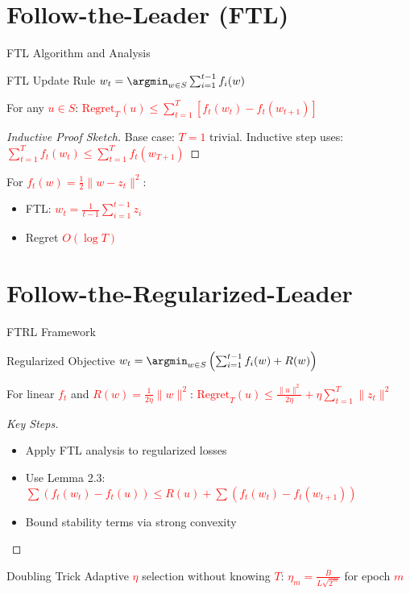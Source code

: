 \documentclass{beamer}
\newcommand{\mathred}[1]{\textcolor{red}{$#1$}} %
\begin{document}
\section{Follow-the-Leader (FTL)}
\begin{frame}{FTL Algorithm and Analysis}
\begin{block}{FTL Update Rule}
\mathred{w_t = \argmin_{w \in S} \sum_{i=1}^{t-1} f_i(w)}
\end{block}

\begin{lemma}
For any \mathred{u \in S}:
\mathred{\text{Regret}_T(u) \leq \sum_{t=1}^T [f_t(w_t) - f_t(w_{t+1})]}
\end{lemma}

\begin{proof}[Inductive Proof Sketch]
Base case: \mathred{T=1} trivial. Inductive step uses:
\mathred{\sum_{t=1}^T f_t(w_t) \leq \sum_{t=1}^T f_t(w_{T+1})}
\end{proof}

\begin{example}
For \mathred{f_t(w) = \frac{1}{2}\|w-z_t\|^2}:
\begin{itemize}
\item FTL: \mathred{w_t = \frac{1}{t-1}\sum_{i=1}^{t-1} z_i}
\item Regret \mathred{O(\log T)}
\end{itemize}
\end{example}
\end{frame}

\section{Follow-the-Regularized-Leader}
\begin{frame}{FTRL Framework}
\begin{block}{Regularized Objective}
\mathred{w_t = \argmin_{w \in S} \left( \sum_{i=1}^{t-1} f_i(w) + R(w) \right)}
\end{block}

\begin{theorem}
For linear \mathred{f_t} and \mathred{R(w) = \frac{1}{2\eta}\|w\|^2}:
\mathred{\text{Regret}_T(u) \leq \frac{\|u\|^2}{2\eta} + \eta \sum_{t=1}^T \|z_t\|^2}
\end{theorem}

\begin{proof}[Key Steps]
\begin{itemize}
\item Apply FTL analysis to regularized losses
\item Use Lemma 2.3: \mathred{\sum (f_t(w_t) - f_t(u)) \leq R(u) + \sum (f_t(w_t) - f_t(w_{t+1}))}
\item Bound stability terms via strong convexity
\end{itemize}
\end{proof}

\begin{block}{Doubling Trick}
Adaptive \mathred{\eta} selection without knowing \mathred{T}:
\mathred{\eta_m = \frac{B}{L\sqrt{2^m}}} for epoch \mathred{m}
\end{block}
\end{frame}
\end{document}
